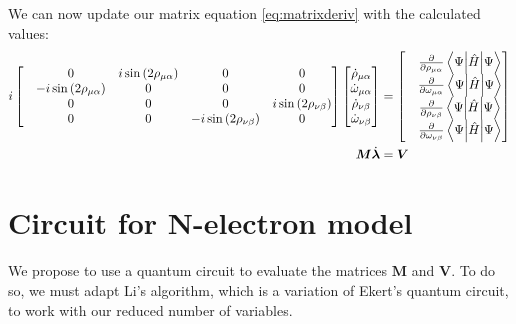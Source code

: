 \documentclass{aux/ttuthes2007}
\newcommand{\sandwich}[3]{\left< #1 \middle\vert #2 \middle\vert #3 \right>}
\newcommand{\s}[1]{\sin\left( #1 \right)}
\newcommand{\pd}[1]{\frac{\partial}{\partial #1}}
\newcommand{\elec}{N}
\newcommand{\ind}[1]{{\uo #1 \oo #1}}
\newcommand{\uo}[1]{
		\IfEqCase{#1}{
			{0}{\mu}
			{1}{\nu}
			{2}{\xi}
		}[\PackageError{uo}{Undefined option to uo: #1}{}]
}
\newcommand{\oo}[1]{
		\IfEqCase{#1}{
			{0}{\alpha}
			{1}{\beta}
			{2}{\gamma}
		}[\PackageError{unocorb}{Undefined option to unuo: #1}{}]
}
\begin{document}
We can now update our matrix equation \ref{eq:matrixderiv} with the calculated values:
\begin{equation*}
\begin{split}
	\label {eq:matrixrw}
	i
	\begin{bmatrix}
		& 0
		& i\s {2\rho_\ind 0}
		& 0
		& 0
		\\
		& -i\s {2\rho_\ind 0}
		& 0
		& 0
		& 0
		\\
		& 0
		& 0
		& 0
		& i\s {2\rho_\ind 1}
		\\
		& 0
		& 0
		& -i\s {2\rho_\ind 1}
		&0
		\\
	\end{bmatrix}
	\begin{bmatrix}
		\dot \rho_\ind 0 \\
		\dot \omega_\ind 0 \\
		\dot \rho_\ind 1 \\
		\dot \omega_\ind 1 \\
	\end{bmatrix}
	&= 
	\begin{bmatrix}
	&\pd{\rho_\ind 0}\sandwich{\Psi}{\hat H}{\Psi} \\
	&\pd{\omega_\ind 0}\sandwich{\Psi}{\hat H}{\Psi} \\
	&\pd{\rho_\ind 1}\sandwich{\Psi}{\hat H}{\Psi} \\
	&\pd{\omega_\ind 1}\sandwich{\Psi}{\hat H}{\Psi} \\
	\end{bmatrix}\\
	\bm M \dot {\bm \lambda} &= \bm V
\end{split}
\end{equation*}

\section {\textbf{Circuit for \elec-electron model}}

We propose to use a quantum circuit to evaluate the matrices $\bm M$ and $\bm V$. To do so, we must adapt Li's  algorithm, which is a variation of Ekert's  quantum circuit, to work with our reduced number of variables.
\end{document}
